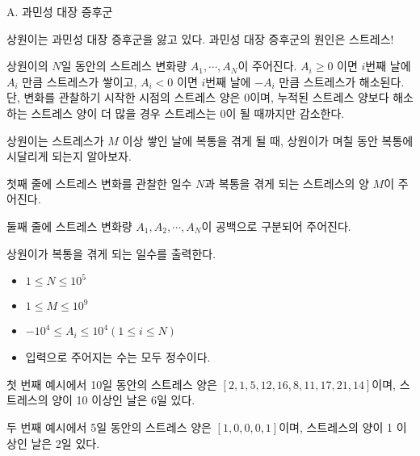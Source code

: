 \def\probtitle{과민성 대장 증후군}
\def\probno{A} %

\begin{problem}{\probno{}. \probtitle{}}

상원이는 과민성 대장 증후군을 앓고 있다. 과민성 대장 증후군의 원인은 스트레스!

상원이의 $N$일 동안의 스트레스 변화량 $A_1, \cdots, A_N$이 주어진다. $A_i \ge 0$ 이면 $i$번째 날에 $A_i$ 만큼 스트레스가 쌓이고, $A_i < 0$ 이면 $i$번째 날에 $-A_i$ 만큼 스트레스가 해소된다. 단, 변화를 관찰하기 시작한 시점의 스트레스 양은 $0$이며, 누적된 스트레스 양보다 해소하는 스트레스 양이 더 많을 경우 스트레스는 $0$이 될 때까지만 감소한다.

상원이는 스트레스가 $M$ 이상 쌓인 날에 복통을 겪게 될 때, 상원이가 며칠 동안 복통에 시달리게 되는지 알아보자.

\InputFile

첫째 줄에 스트레스 변화를 관찰한 일수 $N$과 복통을 겪게 되는 스트레스의 양 $M$이 주어진다.

둘째 줄에 스트레스 변화량 $A_1, A_2, \cdots, A_N$이 공백으로 구분되어 주어진다.

\OutputFile

상원이가 복통을 겪게 되는 일수를 출력한다.

\Constraints

\begin{itemize}[topsep=0pt,noitemsep]
    \item $1 \leq N \leq 10^5$
    \item $1 \leq M \leq 10^9$
    \item $-10^4 \leq A_i \leq 10^4 (1 \le i \le N)$
    \item 입력으로 주어지는 수는 모두 정수이다.
\end{itemize}

\Example

\begin{example}
\end{example}

첫 번째 예시에서 10일 동안의 스트레스 양은 $[2, 1, 5, 12, 16, 8, 11, 17, 21, 14]$이며, 스트레스의 양이 10 이상인 날은 6일 있다.

두 번째 예시에서 5일 동안의 스트레스 양은 $[1, 0, 0, 0, 1]$이며, 스트레스의 양이 1 이상인 날은 2일 있다.



\end{problem}